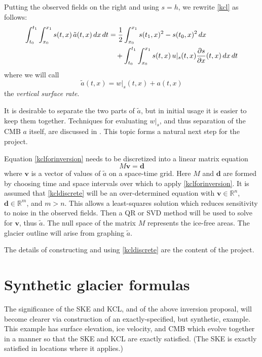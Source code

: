 \documentclass[letterpaper,final,12pt,reqno]{amsart}
\newcommand{\RR}{\mathbb{R}}
\newcommand{\bd}{\mathbf{d}}
\newcommand{\bv}{\mathbf{v}}
\begin{document}
Putting the observed fields on the right and using $s=h$, we rewrite \eqref{kcl} as follows:
\begin{align}
\int_{t_0}^{t_1} \int_{x_0}^{x_1} s(t,x)\, \tilde a(t,x) \,dx\,dt &= \frac{1}{2} \int_{x_0}^{x_1} s(t_1,x)^2 - s(t_0,x)^2\,dx  \label{kclforinversion} \\
    &\quad + \int_{t_0}^{t_1} \int_{x_0}^{x_1} s(t,x)\, u|_s(t,x) \frac{\partial s}{\partial x}(t,x) \,dx\,dt \notag
\end{align}
where we will call
\begin{equation}
\tilde a(t,x) = w|_s(t,x) + a(t,x) \label{surfacerate}
\end{equation}
the \emph{vertical surface rate}.

It is desirable to separate the two parts of $\tilde a$, but in initial usage it is easier to keep them together.  Techniques for evaluating $w|_s$, and thus separation of the CMB $a$ itself, are discussed in \cite{GudmundssonBauder1999}.  This topic forms a natural next step for the project.

Equation \eqref{kclforinversion} needs to be discretized into a linear matrix equation
\begin{equation}
M \bv = \bd \label{kcldiscrete}
\end{equation}
where $\bv$ is a vector of values of $\tilde a$ on a space-time grid.  Here $M$ and $\bd$ are formed by choosing time and space intervals over which to apply \eqref{kclforinversion}.  It is assumed that \eqref{kcldiscrete} will be an over-determined equation with $\bv\in\RR^n$, $\bd\in\RR^m$, and $m>n$.  This allows a least-squares solution which reduces sensitivity to noise in the observed fields.  Then a QR or SVD method will be used to solve for $\bv$, thus $\tilde a$.  The null space of the matrix $M$ represents the ice-free areas.  The glacier outline will arise from graphing $\tilde a$.

The details of constructing and using \eqref{kcldiscrete} are the content of the project.


\section{Synthetic glacier formulas}

The significance of the SKE and KCL, and of the above inversion proposal, will become clearer via construction of an exactly-specified, but synthetic, example.  This example has surface elevation, ice velocity, and CMB which evolve together in a manner so that the SKE and KCL are exactly satisfied.  (The SKE is exactly satisfied in locations where it applies.)
\end{document}

